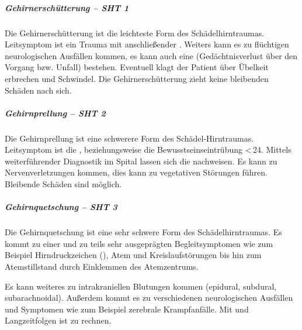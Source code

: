 {%
\subparagraph{Gehirnerschütterung -- SHT 1\textdegree}

 

\noindent Die Gehirnerschütterung ist die leichteste Form des
Schädelhirntraumas. Leitsymptom ist ein Trauma mit
anschließender . Weiters kann es
zu flüchtigen neurologischen Ausfällen kommen, es kann auch eine
(Gedächtnisverlust über den Vorgang bzw. Unfall) bestehen.
Eventuell klagt der Patient über
Übelkeit erbrechen und Schwindel. Die Gehirnerschütterung
zieht keine bleibenden Schäden nach sich.

\subparagraph{Gehirnprellung -- SHT 2\textdegree}

 

\noindent Die Gehirnprellung ist eine schwerere Form des
Schädel-Hirntraumas. Leitsymptom ist die
, beziehungsweise die Bewusstseinseintrübung
 <\,24\Hour*. Mittels weiterführender Diagnostik im Spital
 lassen sich die  nachweisen. Es kann
 zu Nervenverletzungen kommen, dies kann zu vegetativen
 Störungen führen. Bleibende Schäden sind möglich.

\subparagraph{Gehirnquetschung -- SHT 3{\textdegree}}
%
\label{topic:hirnblutung}%

\noindent Die Gehirnquetschung ist eine sehr schwere Form des
Schädelhirntraumas. Es kommt zu einer  und zu teils sehr ausgeprägten
Begleitsymptomen wie zum Beispiel Hirndruckzeichen
(), Atem und
Kreislaufstörungen bis hin zum Atemstillstand durch
Einklemmen des Atemzentrums.

Es kann weiteres zu intrakraniellen Blutungen kommen
(epidural, subdural, subarachnoidal). Außerdem kommt es zu
verschiedenen neurologischen Ausfällen und Symptomen wie zum
Beispiel zerebrale Krampfanfälle. Mit  und Langzeitfolgen ist zu rechnen.

\bigskip

\bigskip

}
